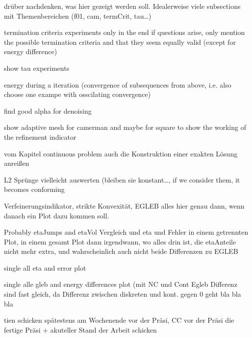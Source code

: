 \begin{frame}
  drüber nachdenken, was hier gezeigt werden soll. Idealerweise viele 
  subsections mit Themenbereichen (f01, cam, termCrit, tau\ldots)

  termination criteria experiments only in the end if questions arise, only
  mention the possible termination criteria and that they seem equally valid
  (except for energy difference)

  show tau experiments

  energy during a iteration (convergence of subsequences from above, i.e.
  also choose one exampe with osscilating convergence)

  find good alpha for denoising

  show adaptive mesh for camerman and maybe for square to show the working
  of the refinement indicator

  vom Kapitel continuous problem auch die Konstruktion einer exakten Lösung
  anreißen

  L2 Sprünge vielleicht auswerten (bleiben sie konstant\ldots, if we consider
  them, it becomes conforming


  Verfeinerungsindikator, strikte Konvexität, EGLEB alles hier genau dann,
  wenn danach ein Plot dazu kommen soll.

  Probably etaJumps and etaVol Vergleich und eta und Fehler in einem getrennten
  Plot, in einem gesamt Plot dann irgendwann, wo alles drin ist, die etaAnteile
  nicht mehr extra, und wahrscheinlich auch nicht beide Differenzen zu EGLEB

  single all eta and error plot

  single alle gleb and energy differences plot (mit NC und Cont Egleb Differenz
  sind fast gleich, da Differenz zwischen diskreten und kont. gegen 0 geht
  bla bla bla
\end{frame}

\begin{frame}
  tien schicken spätestens am Wochenende vor der Präsi, CC vor der Präsi
  die fertige Präsi + akuteller Stand der Arbeit schicken
\end{frame}
